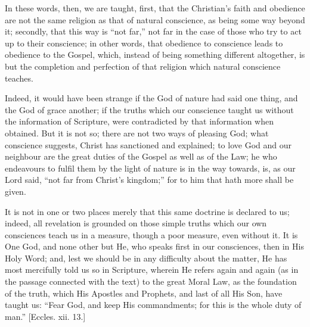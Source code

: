 In these words, then, we are taught, first, that the Christian's
faith and obedience are not the same religion as that of natural
conscience, as being some way beyond it; secondly, that this way is
``not far,'' not far in the case of those who try to act up to
their conscience; in other words, that obedience to conscience leads
to obedience to the Gospel, which, instead of being something
different altogether, is but the completion and perfection of that
religion which natural conscience teaches.

Indeed, it would have been strange if the God of nature had said
one thing, and the God of grace another; if the truths which our
conscience taught us without the information of Scripture, were
contradicted by that information when obtained. But it is not so;
there are not two ways of pleasing God; what conscience suggests,
Christ has sanctioned and explained; to love God and our neighbour are
the great duties of the Gospel as well as of the Law; he who
endeavours to fulfil them by the light of nature is in the way
towards, is, as our Lord said, ``not far from Christ's
kingdom;'' for to him that hath more shall be given.

It is not in one or two places merely that this same doctrine is
declared to us; indeed, all revelation is grounded on those simple
truths which our own consciences teach us in a measure, though a poor
measure, even without it. It is One God, and none other but He, who
speaks first in our consciences, then in His Holy Word; and, lest we
should be in any difficulty about the matter, He has most mercifully
told us so in Scripture, wherein He refers again and again (as in the
passage connected with the text) to the great Moral Law, as the
foundation of the truth, which His Apostles and Prophets, and last of
all His Son, have taught us: ``Fear God, and keep His
commandments; for this is the whole duty of man.'' [Eccles. xii.
13.]

